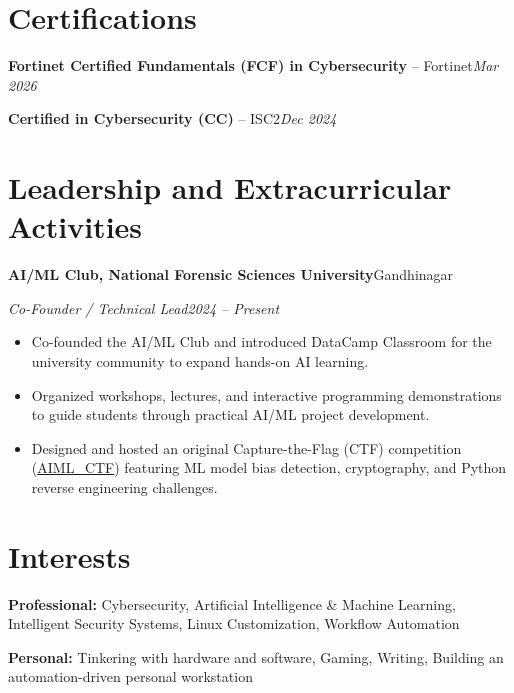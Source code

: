 \documentclass[10pt,a4paper]{article}
\newcommand{\cventry}[4]{%
  \vspace{6pt}%
  \needspace{5\baselineskip}%
  \textbf{#1}\hfill #2\par\nopagebreak[4]%
  \textit{#3}\hfill\textit{#4}\par\nopagebreak[4]%
  \vspace{1.5pt}\nopagebreak[4]%
}
\newcommand{\cvskill}[2]{%
  \textbf{#1:} #2\par\vspace{1.5pt}%
}
\newcommand{\certrow}[3]{%
  \vspace{5pt}\needspace{3\baselineskip}%
  \textbf{#1} -- #2\hfill\textit{#3}\par\nopagebreak[4]%
}
\newcommand{\sep}{\enspace\textbar\enspace}
\begin{document}
\section{Certifications}
\certrow{Fortinet Certified Fundamentals (FCF) in Cybersecurity}{Fortinet}{Mar 2026}
\certrow{Certified in Cybersecurity (CC)}{ISC2}{Dec 2024}

\section{Leadership and Extracurricular Activities}
\cventry{AI/ML Club, National Forensic Sciences University}{Gandhinagar}%
  {Co-Founder / Technical Lead}{2024 -- Present}
\begin{itemize}
  \item Co-founded the AI/ML Club and introduced DataCamp Classroom for the university community to expand hands-on AI learning.
  \item Organized workshops, lectures, and interactive programming demonstrations to guide students through practical AI/ML project development.
  \item Designed and hosted an original Capture-the-Flag (CTF) competition (\href{https://github.com/ADPer0705/AIML_CTF}{AIML\_CTF}) featuring ML model bias detection, cryptography, and Python reverse engineering challenges.
\end{itemize}

\section{Interests}
\cvskill{Professional}{Cybersecurity, Artificial Intelligence \& Machine Learning, Intelligent Security Systems, Linux Customization, Workflow Automation}
\cvskill{Personal}{Tinkering with hardware and software, Gaming, Writing, Building an automation-driven personal workstation}

\end{document}
